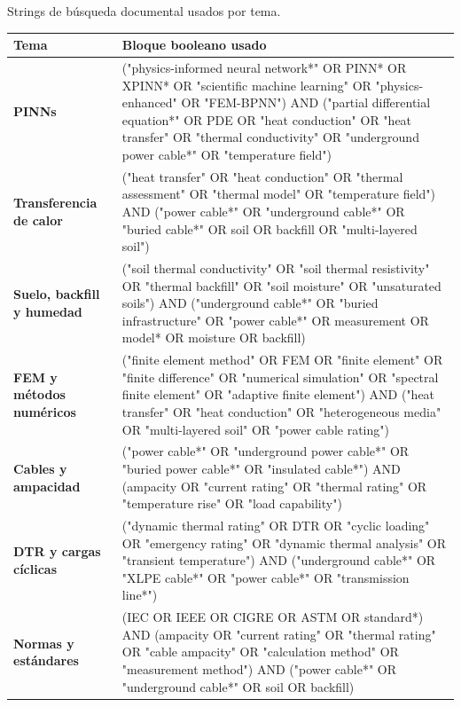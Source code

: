 \documentclass[11pt,a4paper,oneside]{report}
\renewcommand{\arraystretch}{1.18}
\begin{document}
\begin{singlespace}
\clearpage
\begin{landscape}
\thispagestyle{empty}
\begin{center}
\captionsetup{type=table,hypcap=false}
\caption{Strings de búsqueda documental usados por tema.}
\label{tab:strings-documentales}
\vspace{0.4em}
\footnotesize
\setlength{\tabcolsep}{5pt}
\renewcommand{\arraystretch}{1.22}
\begin{tabularx}{\linewidth}{>{\bfseries}L{4.1cm}>{\ttfamily\scriptsize\RaggedRight\arraybackslash}X}
\toprule
\normalfont\bfseries Tema & \normalfont\bfseries Bloque booleano usado \\
\midrule
PINNs & ("physics-informed neural network*" OR PINN* OR XPINN* OR "scientific machine learning" OR "physics-enhanced" OR "FEM-BPNN") AND ("partial differential equation*" OR PDE OR "heat conduction" OR "heat transfer" OR "thermal conductivity" OR "underground power cable*" OR "temperature field") \\
\addlinespace[0.35em]
Transferencia de calor & ("heat transfer" OR "heat conduction" OR "thermal assessment" OR "thermal model" OR "temperature field") AND ("power cable*" OR "underground cable*" OR "buried cable*" OR soil OR backfill OR "multi-layered soil") \\
\addlinespace[0.35em]
Suelo, backfill y humedad & ("soil thermal conductivity" OR "soil thermal resistivity" OR "thermal backfill" OR "soil moisture" OR "unsaturated soils") AND ("underground cable*" OR "buried infrastructure" OR "power cable*" OR measurement OR model* OR moisture OR backfill) \\
\addlinespace[0.35em]
FEM y métodos numéricos & ("finite element method" OR FEM OR "finite element" OR "finite difference" OR "numerical simulation" OR "spectral finite element" OR "adaptive finite element") AND ("heat transfer" OR "heat conduction" OR "heterogeneous media" OR "multi-layered soil" OR "power cable rating") \\
\addlinespace[0.35em]
Cables y ampacidad & ("power cable*" OR "underground power cable*" OR "buried power cable*" OR "insulated cable*") AND (ampacity OR "current rating" OR "thermal rating" OR "temperature rise" OR "load capability") \\
\addlinespace[0.35em]
DTR y cargas cíclicas & ("dynamic thermal rating" OR DTR OR "cyclic loading" OR "emergency rating" OR "dynamic thermal analysis" OR "transient temperature") AND ("underground cable*" OR "XLPE cable*" OR "power cable*" OR "transmission line*") \\
\addlinespace[0.35em]
Normas y estándares & (IEC OR IEEE OR CIGRE OR ASTM OR standard*) AND (ampacity OR "current rating" OR "thermal rating" OR "cable ampacity" OR "calculation method" OR "measurement method") AND ("power cable*" OR "underground cable*" OR soil OR backfill) \\
\bottomrule
\end{tabularx}


\end{center}
\end{landscape}
\end{singlespace}
\end{document}
